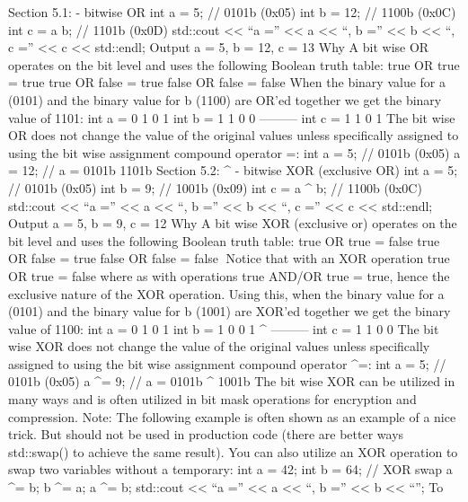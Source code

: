 Section 5.1: \textbar{} - bitwise OR int a = 5; // 0101b (0x05) int b =
12; // 1100b (0x0C) int c = a \textbar{} b; // 1101b (0x0D) std::cout
\textless\textless{} ``a ='' \textless\textless{} a \textless\textless{}
``, b ='' \textless\textless{} b \textless\textless{} ``, c =''
\textless\textless{} c \textless\textless{} std::endl; Output a = 5, b =
12, c = 13 Why A bit wise OR operates on the bit level and uses the
following Boolean truth table: true OR true = true true OR false = true
false OR false = false When the binary value for a (0101) and the binary
value for b (1100) are OR'ed together we get the binary value of 1101:
int a = 0 1 0 1 int b = 1 1 0 0 \textbar{} --------- int c = 1 1 0 1 The
bit wise OR does not change the value of the original values unless
speciﬁcally assigned to using the bit wise assignment compound operator
\textbar=: int a = 5; // 0101b (0x05) a \textbar= 12; // a = 0101b
\textbar{} 1101b Section 5.2: \^{} - bitwise XOR (exclusive OR) int a =
5; // 0101b (0x05) int b = 9; // 1001b (0x09) int c = a \^{} b; // 1100b
(0x0C) std::cout \textless\textless{} ``a ='' \textless\textless{} a
\textless\textless{} ``, b ='' \textless\textless{} b
\textless\textless{} ``, c ='' \textless\textless{} c
\textless\textless{} std::endl; Output a = 5, b = 9, c = 12 Why A bit
wise XOR (exclusive or) operates on the bit level and uses the following
Boolean truth table: true OR true = false true OR false = true false OR
false = false Notice that with an XOR operation true OR true = false
where as with operations true AND/OR true = true, hence the exclusive
nature of the XOR operation. Using this, when the binary value for a
(0101) and the binary value for b (1001) are XOR'ed together we get the
binary value of 1100: int a = 0 1 0 1 int b = 1 0 0 1 \^{} --------- int
c = 1 1 0 0 The bit wise XOR does not change the value of the original
values unless speciﬁcally assigned to using the bit wise assignment
compound operator \^{}=: int a = 5; // 0101b (0x05) a \^{}= 9; // a =
0101b \^{} 1001b The bit wise XOR can be utilized in many ways and is
often utilized in bit mask operations for encryption and compression.
Note: The following example is often shown as an example of a nice
trick. But should not be used in production code (there are better ways
std::swap() to achieve the same result). You can also utilize an XOR
operation to swap two variables without a temporary: int a = 42; int b =
64; // XOR swap a \^{}= b; b \^{}= a; a \^{}= b; std::cout
\textless\textless{} ``a ='' \textless\textless{} a \textless\textless{}
``, b ='' \textless\textless{} b \textless\textless{} ``\n''; To
